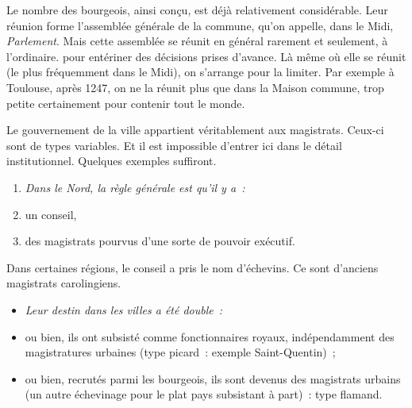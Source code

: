 \documentclass[french,twoside]{book} %
\newlength{\listmod}
\newcommand{\listhead}[1]{\hspace{-1\listmod}\emph{#1}}
\begin{document}
Le nombre des bourgeois, ainsi conçu, est déjà relativement considérable. Leur réunion forme l’assemblée générale de la commune, qu’on appelle, dans le Midi, \emph{Parlement}. Mais cette assemblée se réunit en général rarement et seulement, à l’ordinaire. pour entériner des décisions prises d’avance. Là même où elle se réunit (le plus fréquemment dans le Midi), on s’arrange pour la limiter. Par exemple à Toulouse, après 1247, on ne la réunit plus que dans la Maison commune, trop petite certainement pour contenir tout le monde.\par
Le gouvernement de la ville appartient véritablement aux magistrats. Ceux-ci sont de types variables. Et il est impossible d’entrer ici dans le détail institutionnel. Quelques exemples suffiront.\par

\begin{enumerate}[itemsep=0pt,]
\item[]\listhead{Dans le Nord, la règle générale est qu’il y a :}
\item un conseil,
\item des magistrats pourvus d’une sorte de pouvoir exécutif.
\end{enumerate}

\noindent Dans certaines régions, le conseil a pris le nom d’échevins. Ce sont d’anciens magistrats carolingiens.\par

\begin{itemize}[itemsep=0pt,]
\item[]\listhead{Leur destin dans les villes a été double :}
\item ou bien, ils ont subsisté comme fonctionnaires royaux, indépendamment des magistratures urbaines (type picard : exemple Saint-Quentin) ;
\item ou bien, recrutés parmi les bourgeois, ils sont devenus des magistrats urbains (un autre échevinage pour le plat pays subsistant à part) : type flamand.
\end{itemize}
\end{document}
